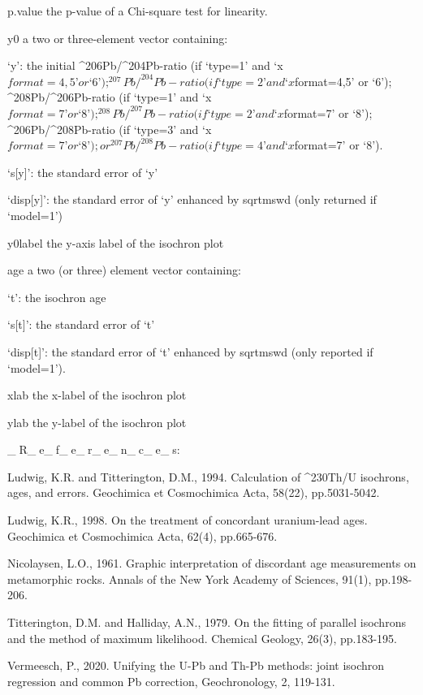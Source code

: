      p.value the p-value of a Chi-square test for linearity.

     y0 a two or three-element vector containing:

          ‘y’: the initial ^{206}Pb/^{204}Pb-ratio (if ‘type=1’ and
          ‘x$format=4,5’ or ‘6’); ^{207}Pb/^{204}Pb-ratio (if ‘type=2’
          and ‘x$format=4,5’ or ‘6’); ^{208}Pb/^{206}Pb-ratio (if
          ‘type=1’ and ‘x$format=7’ or ‘8’); ^{208}Pb/^{207}Pb-ratio
          (if ‘type=2’ and ‘x$format=7’ or ‘8’);
          ^{206}Pb/^{208}Pb-ratio (if ‘type=3’ and ‘x$format=7’ or
          ‘8’); or ^{207}Pb/^{208}Pb-ratio (if ‘type=4’ and
          ‘x$format=7’ or ‘8’).

          ‘s[y]’: the standard error of ‘y’

          ‘disp[y]’: the standard error of ‘y’ enhanced by sqrt{mswd}
          (only returned if ‘model=1’)

     y0label the y-axis label of the isochron plot

     age a two (or three) element vector containing:

          ‘t’: the isochron age

          ‘s[t]’: the standard error of ‘t’

          ‘disp[t]’: the standard error of ‘t’ enhanced by sqrt{mswd}
          (only reported if ‘model=1’).

     xlab the x-label of the isochron plot

     ylab the y-label of the isochron plot

_R_e_f_e_r_e_n_c_e_s:

     Ludwig, K.R. and Titterington, D.M., 1994. Calculation of
     ^{230}Th/U isochrons, ages, and errors. Geochimica et Cosmochimica
     Acta, 58(22), pp.5031-5042.

     Ludwig, K.R., 1998. On the treatment of concordant uranium-lead
     ages. Geochimica et Cosmochimica Acta, 62(4), pp.665-676.

     Nicolaysen, L.O., 1961. Graphic interpretation of discordant age
     measurements on metamorphic rocks. Annals of the New York Academy
     of Sciences, 91(1), pp.198-206.

     Titterington, D.M. and Halliday, A.N., 1979. On the fitting of
     parallel isochrons and the method of maximum likelihood. Chemical
     Geology, 26(3), pp.183-195.

     Vermeesch, P., 2020. Unifying the U-Pb and Th-Pb methods: joint
     isochron regression and common Pb correction, Geochronology, 2,
     119-131.

